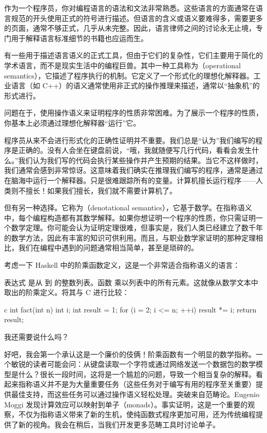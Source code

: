 作为一个程序员，你对编程语言的语法和文法非常熟悉。这些语言的方面通常在语言规范的开头使用正式的符号进行描述。但语言的含义或语义要难得多，需要更多的页面，通常不够正式，几乎从未完整。因此，语言律师之间的讨论永无止境，专门用于解释语言标准细节的书籍也应运而生。

有一些用于描述语言语义的正式工具，但由于它们的复杂性，它们主要用于简化的学术语言，而不是现实生活中的编程巨兽。其中一种工具称为（operational semantics），它描述了程序执行的机制。它定义了一个形式化的理想化解释器。工业语言（如 C++）的语义通常使用非正式的操作推理来描述，通常以“抽象机”的形式进行。

问题在于，使用操作语义来证明程序的性质非常困难。为了展示一个程序的性质，你基本上必须通过理想化解释器“运行”它。

程序员从来不会进行形式化的正确性证明并不重要。我们总是“认为”我们编写的程序是正确的。没有人会坐在键盘前说，“哦，我就随便写几行代码，看看会发生什么。”我们认为我们写的代码会执行某些操作并产生预期的结果。当它不这样做时，我们通常会感到非常惊讶。这意味着我们确实在推理我们编写的程序，通常是通过在脑海中运行一个解释器。只是很难跟踪所有的变量。计算机擅长运行程序——人类则不擅长！如果我们擅长，我们就不需要计算机了。

但有另一种选择。它称为（denotational semantics），它基于数学。在指称语义中，每个编程构造都有其数学解释。如果你想证明一个程序的性质，你只需证明一个数学定理。你可能会认为证明定理很难，但事实是，我们人类已经建立了数千年的数学方法，因此有丰富的知识可供利用。而且，与职业数学家证明的那种定理相比，我们在编程中遇到的问题通常相当简单，甚至是琐碎的。

考虑一下 Haskell 中的阶乘函数定义，这是一个非常适合指称语义的语言：

表达式 \code{{[}1..n{]}} 是从  到  的整数列表。函数  乘以列表中的所有元素。这就像从数学文本中取出的阶乘定义。将其与 C 进行比较：

\begin{snip}{c}
  int fact(int n) {
    int i;
    int result = 1;
    for (i = 2; i <= n; ++i)
    result *= i;
    return result;
  }
\end{snip}
我还需要说什么吗？

好吧，我会第一个承认这是一个廉价的伎俩！阶乘函数有一个明显的数学指称。一个敏锐的读者可能会问：从键盘读取一个字符或通过网络发送一个数据包的数学模型是什么？很长一段时间，这将是一个尴尬的问题，导致一个相当复杂的解释。看起来指称语义并不是为大量重要任务（这些任务对于编写有用的程序至关重要）提供最佳支持，而这些任务可以通过操作语义轻松处理。突破来自范畴论。Eugenio Moggi 发现计算效应可以映射到单子（monads）。事实证明，这是一个重要的观察，不仅为指称语义带来了新的生机，使纯函数式程序更加可用，还为传统编程提供了新的视角。我会在稍后，当我们开发更多范畴工具时讨论单子。

